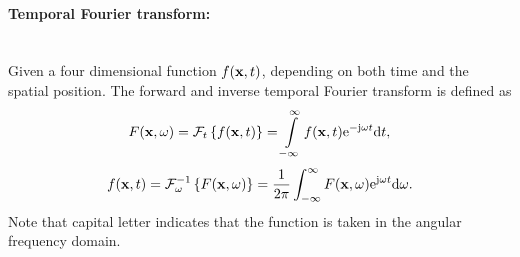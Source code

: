 \paragraph{Temporal Fourier transform:}\mbox{} \\
Given a four dimensional function $f(\mathbf{x},t)$, depending on both time and the spatial position.
The forward and inverse temporal Fourier transform is defined as 
\begin{equation}
\label{eq:temporal_fourier_transform_def}
F(\mathbf{x},\omega) = \mathcal{F}_t \left\{ f(\mathbf{x},t) \right\} = \int\limits_ {-\infty}^{\infty} f(\mathbf{x},t) \mathrm{e}^{-\mathrm{j} \omega t} \mathrm{d} t,
\end{equation}
\begin{equation}
\label{eq:temporal_inverse_fourier_transform_def}
f(\mathbf{x},t) = \mathcal{F}_{\omega}^{-1} \left\{ F(\mathbf{x},\omega) \right\} = \frac{1}{2\pi} \int_ {-\infty}^{\infty} F(\mathbf{x},\omega) \mathrm{e}^{ \mathrm{j} \omega t} \mathrm{d} \omega.
\end{equation}
Note that capital letter indicates that the function is taken in the angular frequency domain.
%
